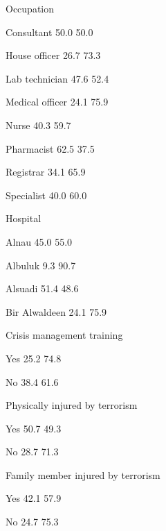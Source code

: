Occupation



  Consultant
50.0%
50.0%

  House officer
26.7%
73.3%

  Lab technician
47.6%
52.4%

  Medical officer
24.1%
75.9%

  Nurse
40.3%
59.7%

  Pharmacist
62.5%
37.5%

  Registrar
34.1%
65.9%

  Specialist
40.0%
60.0%

Hospital



  Alnau
45.0%
55.0%

  Albuluk
9.3%
90.7%

  Alsuadi
51.4%
48.6%

  Bir Alwaldeen
24.1%
75.9%

Crisis management training



  Yes
25.2%
74.8%

  No
38.4%
61.6%

Physically injured by terrorism



  Yes
50.7%
49.3%

  No
28.7%
71.3%

Family member injured by terrorism



  Yes
42.1%
57.9%

  No
24.7%
75.3%






